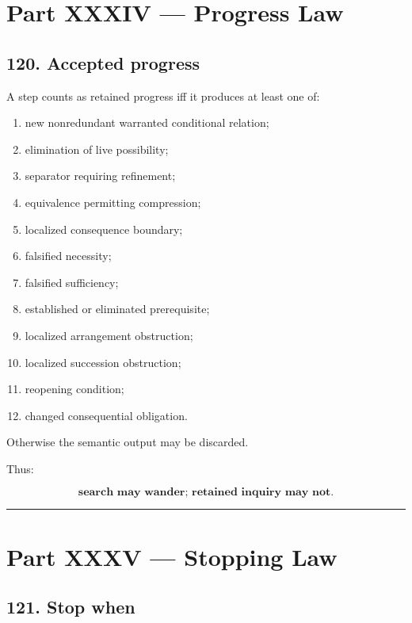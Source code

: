 \documentclass[
]{article}
\providecommand{\tightlist}{%
  \setlength{\itemsep}{0pt}\setlength{\parskip}{0pt}}
\begin{document}
\section{Part XXXIV --- Progress Law}\label{part-xxxiv-progress-law}

\subsection{120. Accepted progress}\label{accepted-progress}

A step counts as retained progress iff it produces at least one of:

\begin{enumerate}
\def\labelenumi{\arabic{enumi}.}
\tightlist
\item
  new nonredundant warranted conditional relation;
\item
  elimination of live possibility;
\item
  separator requiring refinement;
\item
  equivalence permitting compression;
\item
  localized consequence boundary;
\item
  falsified necessity;
\item
  falsified sufficiency;
\item
  established or eliminated prerequisite;
\item
  localized arrangement obstruction;
\item
  localized succession obstruction;
\item
  reopening condition;
\item
  changed consequential obligation.
\end{enumerate}

Otherwise the semantic output may be discarded.

Thus:

\[
\boxed{
\textbf{search may wander;
retained inquiry may not.}
}
\]

\begin{center}\rule{0.5\linewidth}{0.5pt}\end{center}

\section{Part XXXV --- Stopping Law}\label{part-xxxv-stopping-law}

\subsection{121. Stop when}\label{stop-when}
\end{document}
